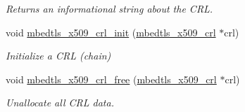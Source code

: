\begin{DoxyCompactItemize}
\begin{DoxyCompactList}\small\item\em Returns an informational string about the C\-R\-L. \end{DoxyCompactList}\item 
void \hyperlink{group__x509__module_ga8513a192e281217802837571da98e218}{mbedtls\-\_\-x509\-\_\-crl\-\_\-init} (\hyperlink{structmbedtls__x509__crl}{mbedtls\-\_\-x509\-\_\-crl} $\ast$crl)
\begin{DoxyCompactList}\small\item\em Initialize a C\-R\-L (chain) \end{DoxyCompactList}\item 
void \hyperlink{group__x509__module_gaeb19c3326889f9e493fbd605c1113b96}{mbedtls\-\_\-x509\-\_\-crl\-\_\-free} (\hyperlink{structmbedtls__x509__crl}{mbedtls\-\_\-x509\-\_\-crl} $\ast$crl)
\begin{DoxyCompactList}\small\item\em Unallocate all C\-R\-L data. \end{DoxyCompactList}\end{DoxyCompactItemize}
